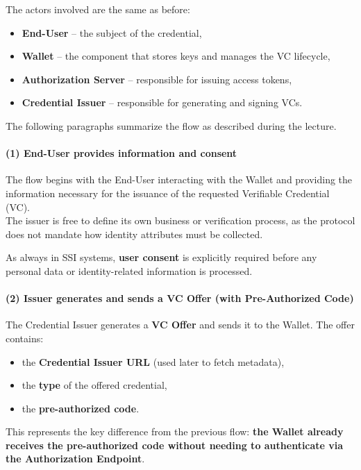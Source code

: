 \noindent
The actors involved are the same as before:
\begin{itemize}
    \item \textbf{End-User} – the subject of the credential,
    \item \textbf{Wallet} – the component that stores keys and manages the VC lifecycle,
    \item \textbf{Authorization Server} – responsible for issuing access tokens,
    \item \textbf{Credential Issuer} – responsible for generating and signing VCs.
\end{itemize}

\noindent
The following paragraphs summarize the flow as described during the lecture.

\paragraph{(1) End-User provides information and consent}
The flow begins with the End-User interacting with the Wallet and providing the information necessary for the issuance of the requested Verifiable Credential (VC).\\  
The issuer is free to define its own business or verification process, as the protocol does not mandate how identity attributes must be collected. 
\medskip 

\noindent
As always in SSI systems, \textbf{user consent} is explicitly required before any personal data or identity-related information is processed.


\paragraph{(2) Issuer generates and sends a VC Offer (with Pre-Authorized Code)}
The Credential Issuer generates a \textbf{VC Offer} and sends it to the Wallet.  
The offer contains:
\begin{itemize}
    \item the \textbf{Credential Issuer URL} (used later to fetch metadata),
    \item the \textbf{type} of the offered credential,
    \item the \textbf{pre-authorized code}.
\end{itemize}

\noindent
This represents the key difference from the previous flow:  
\textbf{the Wallet already receives the pre-authorized code without needing to authenticate via the Authorization Endpoint}.

